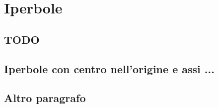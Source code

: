 
\chapter{Iperbole}

\section{TODO}

\section{Iperbole con centro nell'origine e assi ...}
\label{sec:01_formacanonica}

% 

\section{Altro paragrafo}
\label{sec:02_altro}
